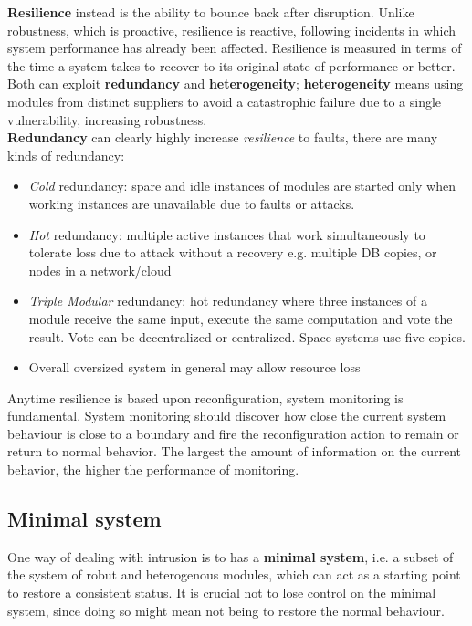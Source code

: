 \textbf{Resilience} instead is the ability to bounce back after disruption. Unlike
robustness, which is proactive, resilience is reactive, following
incidents in which system performance has already been affected.
Resilience is measured in terms of the time a system takes to recover
to its original state of performance or better.
\nl
Both can exploit \textbf{redundancy} and \textbf{heterogeneity};
\textbf{heterogeneity} means using modules from distinct suppliers to avoid a catastrophic failure due to a single vulnerability, increasing robustness.\\
\textbf{Redundancy} can clearly highly increase \textit{resilience} to faults,
there are many kinds of redundancy:
\begin{itemize}
    \item \textit{Cold} redundancy: spare and idle instances of modules are started only when working instances are unavailable due to faults or attacks.
    \item \textit{Hot} redundancy: multiple active instances that work simultaneously to tolerate loss due to attack without a recovery e.g. multiple DB copies, or nodes in a network/cloud
    \item \textit{Triple Modular} redundancy: hot redundancy where three instances of a
    module receive the same input, execute the same computation and vote the
    result. Vote can be decentralized or centralized. Space systems use five copies.
    \item Overall oversized system in general may allow resource loss
\end{itemize}

Anytime resilience is based upon reconfiguration, system monitoring is fundamental.
System monitoring should discover how close the current system behaviour is close to a boundary and fire the reconfiguration action to remain or return to normal behavior.
The largest the amount of information on the current behavior, the higher the performance of monitoring.

\subsection{Minimal system}
One way of dealing with intrusion is to has a \textbf{minimal system}, i.e. a subset of the system of robut and heterogenous modules,
which can act as a starting point to restore a consistent status.
It is crucial not to lose control on the minimal system,
since doing so might mean not being to restore the normal behaviour.

